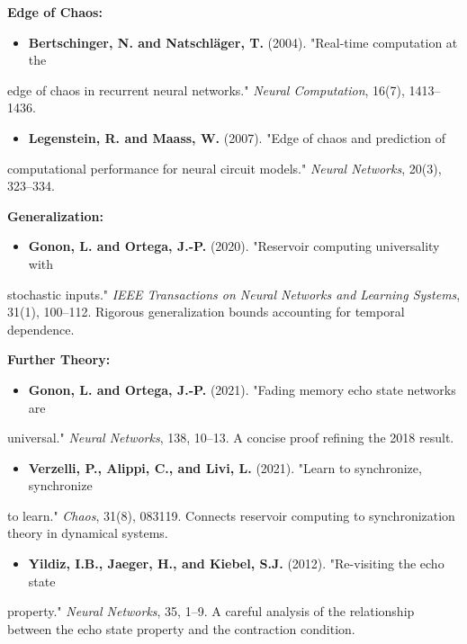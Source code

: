 \textbf{Edge of Chaos:}
\begin{itemize}[nosep]
  \item \textbf{Bertschinger, N. and Natschl\"ager, T.} (2004). "Real-time computation at the
\end{itemize}
  edge of chaos in recurrent neural networks." \textit{Neural Computation}, 16(7), 1413--1436.

\begin{itemize}[nosep]
  \item \textbf{Legenstein, R. and Maass, W.} (2007). "Edge of chaos and prediction of
\end{itemize}
  computational performance for neural circuit models." \textit{Neural Networks}, 20(3),
  323--334.

\textbf{Generalization:}
\begin{itemize}[nosep]
  \item \textbf{Gonon, L. and Ortega, J.-P.} (2020). "Reservoir computing universality with
\end{itemize}
  stochastic inputs." \textit{IEEE Transactions on Neural Networks and Learning Systems},
  31(1), 100--112. Rigorous generalization bounds accounting for temporal dependence.

\textbf{Further Theory:}
\begin{itemize}[nosep]
  \item \textbf{Gonon, L. and Ortega, J.-P.} (2021). "Fading memory echo state networks are
\end{itemize}
  universal." \textit{Neural Networks}, 138, 10--13. A concise proof refining the 2018 result.

\begin{itemize}[nosep]
  \item \textbf{Verzelli, P., Alippi, C., and Livi, L.} (2021). "Learn to synchronize, synchronize
\end{itemize}
  to learn." \textit{Chaos}, 31(8), 083119. Connects reservoir computing to synchronization
  theory in dynamical systems.

\begin{itemize}[nosep]
  \item \textbf{Yildiz, I.B., Jaeger, H., and Kiebel, S.J.} (2012). "Re-visiting the echo state
\end{itemize}
  property." \textit{Neural Networks}, 35, 1--9. A careful analysis of the relationship between
  the echo state property and the contraction condition.
